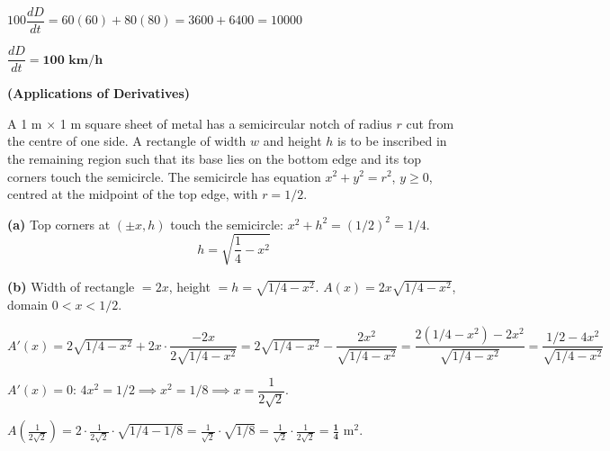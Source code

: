\documentclass[addpoints]{exam}
\begin{document}
\begin{questions}
\begin{solution}[10cm]
$100\dfrac{dD}{dt} = 60(60) + 80(80) = 3600 + 6400 = 10000$

$\dfrac{dD}{dt} = \mathbf{100 \text{ km/h}}$
\end{solution}

\question \textbf{(Applications of Derivatives)}

A 1 m $\times$ 1 m square sheet of metal has a semicircular notch of radius $r$ cut from
the centre of one side. A rectangle of width $w$ and height $h$ is to be inscribed in the
remaining region such that its base lies on the bottom edge and its top corners touch the
semicircle. The semicircle has equation $x^2 + y^2 = r^2$, $y \geq 0$, centred at the midpoint
of the top edge, with $r = 1/2$.
\begin{solution}[10cm]
\textbf{(a)} Top corners at $(\pm x, h)$ touch the semicircle: $x^2 + h^2 = (1/2)^2 = 1/4$.
\[
h = \sqrt{\frac{1}{4} - x^2}
\]

\textbf{(b)} Width of rectangle $= 2x$, height $= h = \sqrt{1/4-x^2}$.
$A(x) = 2x\sqrt{1/4-x^2}$, domain $0 < x < 1/2$.

$A'(x) = 2\sqrt{1/4-x^2} + 2x \cdot \dfrac{-2x}{2\sqrt{1/4-x^2}}
= 2\sqrt{1/4-x^2} - \dfrac{2x^2}{\sqrt{1/4-x^2}}
= \dfrac{2(1/4-x^2)-2x^2}{\sqrt{1/4-x^2}} = \dfrac{1/2 - 4x^2}{\sqrt{1/4-x^2}}$

$A'(x) = 0$: $4x^2 = 1/2 \implies x^2 = 1/8 \implies x = \dfrac{1}{2\sqrt{2}}$.

$A\!\left(\tfrac{1}{2\sqrt{2}}\right) = 2 \cdot \tfrac{1}{2\sqrt{2}} \cdot \sqrt{1/4-1/8}
= \tfrac{1}{\sqrt{2}}\cdot\sqrt{1/8} = \tfrac{1}{\sqrt{2}}\cdot\tfrac{1}{2\sqrt{2}} = \mathbf{\tfrac{1}{4}}$ m$^2$.


\end{solution}
\end{questions}
\end{document}

